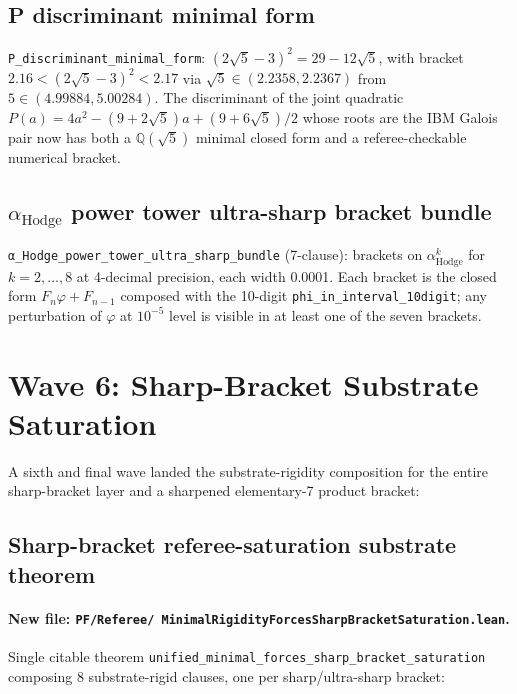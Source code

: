 \subsection{P discriminant minimal form}

\verb|P_discriminant_minimal_form|:
$(2\sqrt{5} - 3)^2 = 29 - 12\sqrt{5}$, with bracket
$2.16 < (2\sqrt{5} - 3)^2 < 2.17$ via $\sqrt{5} \in (2.2358, 2.2367)$
from $5 \in (4.99884, 5.00284)$. The discriminant of the joint
quadratic $P(a) = 4a^2 - (9 + 2\sqrt{5}) a + (9 + 6\sqrt{5})/2$
whose roots are the IBM Galois pair now has both a $\mathbb{Q}(\sqrt{5})$
minimal closed form and a referee-checkable numerical bracket.

\subsection{\texorpdfstring{$\alpha_{\text{Hodge}}$}{alpha\_Hodge} power tower ultra-sharp bracket bundle}

\verb|α_Hodge_power_tower_ultra_sharp_bundle| (7-clause): brackets on
$\alpha_{\text{Hodge}}^k$ for $k = 2, \ldots, 8$ at 4-decimal
precision, each width 0.0001. Each bracket is the closed form
$F_n \varphi + F_{n-1}$ composed with the 10-digit
\verb|phi_in_interval_10digit|; any perturbation of $\varphi$ at
$10^{-5}$ level is visible in at least one of the seven brackets.

\section{Wave 6: Sharp-Bracket Substrate Saturation}
\label{sec:wave6-2026-06-16}

A sixth and final wave landed the substrate-rigidity composition for
the entire sharp-bracket layer and a sharpened elementary-7 product
bracket:

\subsection{Sharp-bracket referee-saturation substrate theorem}

\paragraph{\texorpdfstring{New file: \texttt{PF/Referee/
  MinimalRigidityForcesSharpBracketSaturation.lean}.}{New file: PF/Referee/MinimalRigidityForcesSharpBracketSaturation.lean.}}
Single citable theorem
\verb|unified_minimal_forces_sharp_bracket_saturation| composing 8
substrate-rigid clauses, one per sharp/ultra-sharp bracket:

